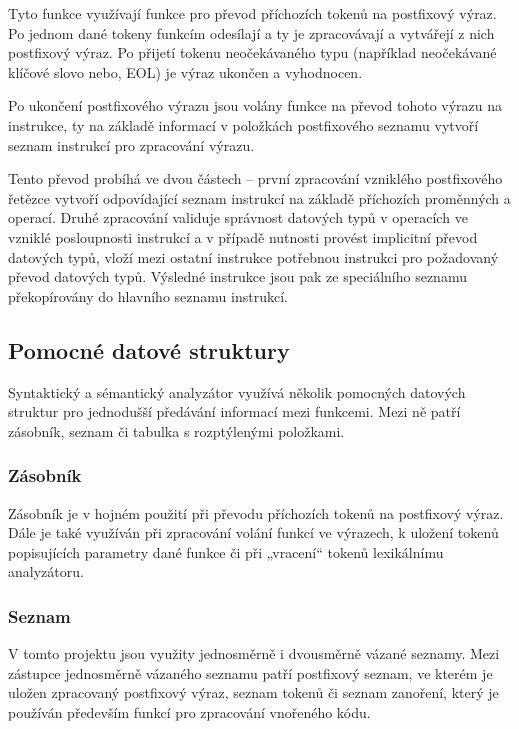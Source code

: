 \documentclass[a4paper,11pt]{article}
\begin{document}
Tyto funkce využívají funkce pro převod příchozích tokenů na postfixový výraz. Po jednom dané tokeny funkcím odesílají a ty je zpracovávají a vytvářejí z nich postfixový výraz. Po přijetí tokenu neočekávaného typu (například neočekávané klíčové slovo nebo, \textsf{EOL}) je výraz ukončen a vyhodnocen.

\vspace{2mm}
Po ukončení postfixového výrazu jsou volány funkce na převod tohoto výrazu na instrukce, ty na základě informací v položkách postfixového seznamu vytvoří seznam instrukcí pro zpracování výrazu.

\vspace{2mm}
Tento převod probíhá ve dvou částech – první zpracování vzniklého postfixového řetězce vytvoří odpovídající seznam instrukcí na základě příchozích proměnných a operací. Druhé zpracování validuje správnost datových typů v operacích ve vzniklé posloupnosti instrukcí a v případě nutnosti provést implicitní převod datových typů, vloží mezi ostatní instrukce potřebnou instrukci pro požadovaný převod datových typů.
Výsledné instrukce jsou pak ze speciálního seznamu překopírovány do hlavního seznamu instrukcí.

\subsection{Pomocné datové struktury} \label{syse-struktury}
Syntaktický a sémantický analyzátor využívá několik pomocných datových struktur pro jednodušší předávání informací mezi funkcemi. Mezi ně patří zásobník, seznam či tabulka s rozptýlenými položkami.

\subsubsection{Zásobník} \label{syse-struktury-zasobnik}
Zásobník je v hojném použití při převodu příchozích tokenů na postfixový výraz. Dále je také využíván při zpracování volání funkcí ve výrazech, k uložení tokenů popisujících parametry dané funkce či při „vracení“ tokenů lexikálnímu analyzátoru.

\subsubsection{Seznam} \label{syse-struktury-seznam}
V tomto projektu jsou využity jednosměrně i dvousměrně vázané seznamy. Mezi zástupce jednosměrně vázaného seznamu patří postfixový seznam, ve kterém je uložen zpracovaný postfixový výraz, seznam tokenů či seznam zanoření, který je používán především funkcí pro zpracování vnořeného kódu.
\end{document}
